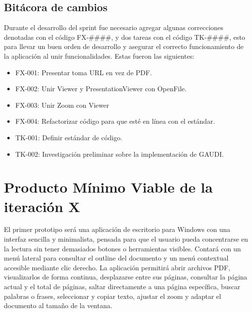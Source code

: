 \subsection{Bitácora de cambios}



Durante el desarrollo del sprint fue necesario agregar algunas correcciones denotadas con el código FX-\#\#\#\#, y dos tareas con el código TK-\#\#\#\#, esto para llevar un buen orden de desarrollo y asegurar el correcto funcionamiento de la aplicación al unir funcionalidades. Estas fueron las siguientes:
\begin{itemize}
    \item FX-001: Presentar toma URL en vez de PDF.
    \item FX-002: Unir Viewer y PresentationViewer con OpenFile.
    \item FX-003: Unir Zoom con Viewer
    \item FX-004: Refactorizar código para que esté en línea con el estándar.
    \item TK-001: Definir estándar de código.
    \item TK-002: Investigación preliminar sobre la implementación de GAUDI.
\end{itemize}

\section{Producto Mínimo Viable de la iteración X}

El primer prototipo será una aplicación de escritorio para Windows con una interfaz sencilla y minimalista, pensada para que el usuario pueda concentrarse en la lectura sin tener demasiados botones o herramientas visibles. Contará con un menú lateral para consultar el outline del documento y un menú contextual accesible mediante clic derecho. La aplicación permitirá abrir archivos PDF, visualizarlos de forma continua, desplazarse entre sus páginas, consultar la página actual y el total de páginas, saltar directamente a una página específica, buscar palabras o frases, seleccionar y copiar texto, ajustar el zoom y adaptar el documento al tamaño de la ventana.


